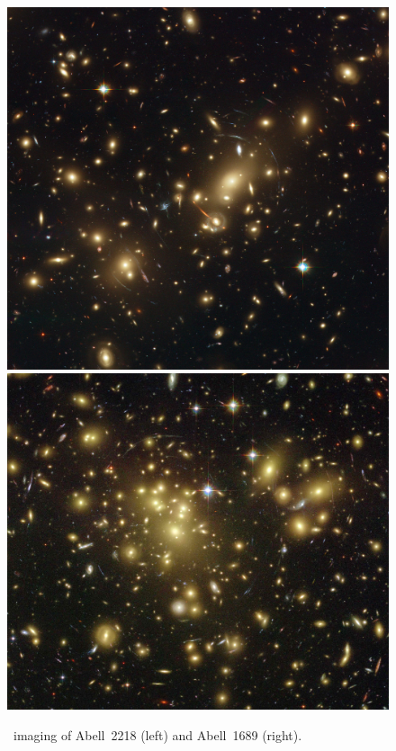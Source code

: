 \begin{figure}
\centering
\includegraphics[height=0.3\textheight]{Intro/a2218.jpg}
\includegraphics[height=0.3\textheight]{Intro/a1689.jpg}
\caption[Abell 2218 and Abell 1689]{\hst\ imaging of Abell~2218 (left) and Abell~1689 (right).}
\label{intro:fig:lensing_clusters}
\end{figure}

